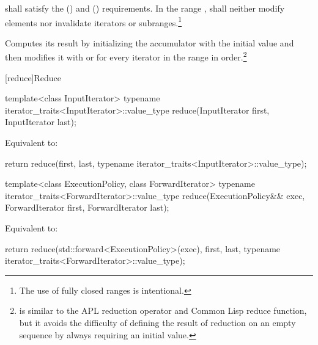 \begin{itemdescr}
\pnum
\requires
{} shall satisfy the  ()
and  () requirements.
In the range
,
shall neither modify elements nor invalidate iterators or subranges.\footnote{The use of fully closed ranges is intentional.}

\pnum
\effects
Computes its result by initializing the accumulator
with the initial value
and then modifies it with
or
for every iterator
in the range 
in order.\footnote{
is similar to the APL reduction operator and Common Lisp reduce function, but
it avoids the difficulty of defining the result of reduction on an empty
sequence by always requiring an initial value.}
\end{itemdescr}

[reduce]{Reduce}

%
\begin{itemdecl}
template<class InputIterator>
  typename iterator_traits<InputIterator>::value_type
    reduce(InputIterator first, InputIterator last);
\end{itemdecl}

\begin{itemdescr}
\pnum
\effects Equivalent to:
\begin{codeblock}
return reduce(first, last,
              typename iterator_traits<InputIterator>::value_type{});
\end{codeblock}
\end{itemdescr}

%
\begin{itemdecl}
template<class ExecutionPolicy, class ForwardIterator>
  typename iterator_traits<ForwardIterator>::value_type
    reduce(ExecutionPolicy&& exec,
           ForwardIterator first, ForwardIterator last);
\end{itemdecl}

\begin{itemdescr}
\pnum
\effects Equivalent to:
\begin{codeblock}
return reduce(std::forward<ExecutionPolicy>(exec), first, last,
              typename iterator_traits<ForwardIterator>::value_type{});
\end{codeblock}
\end{itemdescr}


